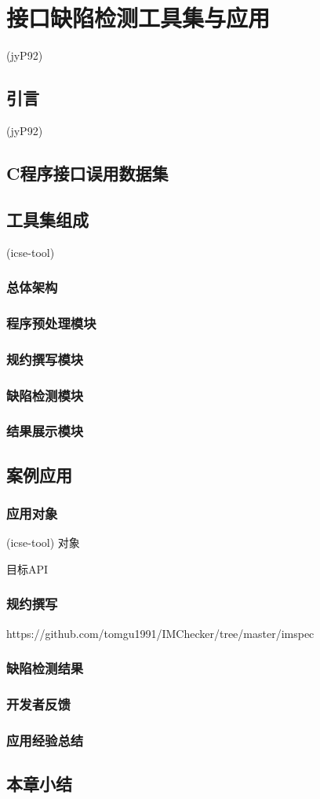 \chapter{接口缺陷检测工具集与应用}
\label{cha:tools}

(jyP92)

\section{引言}
(jyP92)

\section{C程序接口误用数据集}

\section{工具集组成}
(icse-tool)
\subsection{总体架构}
\subsection{程序预处理模块}
\subsection{规约撰写模块}
\subsection{缺陷检测模块}
\subsection{结果展示模块}

\section{案例应用}
\subsection{应用对象}
(icse-tool)
对象

目标API
\subsection{规约撰写}
https://github.com/tomgu1991/IMChecker/tree/master/imspec

\subsection{缺陷检测结果}
\subsection{开发者反馈}

\subsection{应用经验总结}

\section{本章小结}

